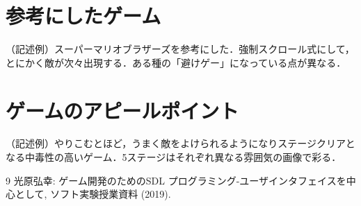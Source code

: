 \documentclass{jsarticle}
\begin{document}
\section{参考にしたゲーム}
（記述例）スーパーマリオブラザーズを参考にした．強制スクロール式にして，とにかく敵が次々出現する．ある種の「避けゲー」になっている点が異なる．

\section{ゲームのアピールポイント}
（記述例）やりこむとほど，うまく敵をよけられるようになりステージクリアとなる中毒性の高いゲーム．5ステージはそれぞれ異なる雰囲気の画像で彩る．

\begin{thebibliography}{9}
 光原弘幸: ゲーム開発のためのSDL プログラミング-ユーザインタフェイスを中心として,  ソフト実験授業資料 (2019).
\end{thebibliography}
\end{document}
